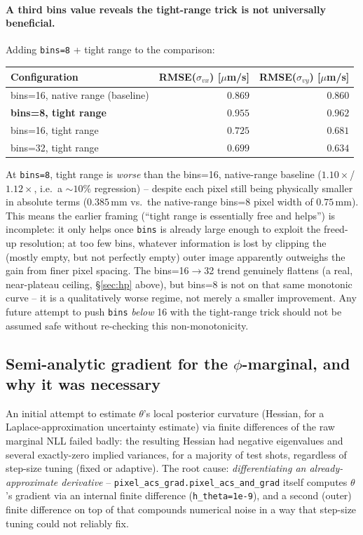 \documentclass[11pt,a4paper]{article}
\newcommand{\code}[1]{\texttt{#1}}
\begin{document}
\paragraph{A third bins value reveals the tight-range trick is not
universally beneficial.} Adding \code{bins=8} + tight range to the
comparison:

\begin{center}
\begin{tabular}{lrr}
\toprule
Configuration & RMSE($\sigma_{vx}$) [$\mu$m/s] & RMSE($\sigma_{vy}$) [$\mu$m/s] \\
\midrule
bins=16, native range (baseline)  & $0.869$ & $0.860$ \\
\textbf{bins=8, tight range}      & $\mathbf{0.955}$ & $\mathbf{0.962}$ \\
bins=16, tight range              & $0.725$ & $0.681$ \\
bins=32, tight range              & $0.699$ & $0.634$ \\
\bottomrule
\end{tabular}
\end{center}

At \code{bins=8}, tight range is \emph{worse} than the bins=16, native-range
baseline ($1.10\times$/$1.12\times$, i.e.\ a $\sim\!10\%$ regression) --
despite each pixel still being physically smaller in absolute terms
($0.385\,$mm vs.\ the native-range bins=8 pixel width of $0.75\,$mm). This
means the earlier framing (``tight range is essentially free and helps'')
is incomplete: it only helps once \code{bins} is already large enough to
exploit the freed-up resolution; at too few bins, whatever information is
lost by clipping the (mostly empty, but not perfectly empty) outer image
apparently outweighs the gain from finer pixel spacing. The bins=16$\to$32
trend genuinely flattens (a real, near-plateau ceiling, \S\ref{sec:hp}
above), but bins=8 is not on that same monotonic curve -- it is a
qualitatively worse regime, not merely a smaller improvement. Any future
attempt to push \code{bins} \emph{below} 16 with the tight-range trick
should not be assumed safe without re-checking this non-monotonicity.

\subsection{Semi-analytic gradient for the $\phi$-marginal, and why it was
necessary}
\label{sec:analytic-grad}

An initial attempt to estimate $\theta$'s local posterior curvature
(Hessian, for a Laplace-approximation uncertainty estimate) via finite
differences of the raw marginal NLL failed badly: the resulting Hessian had
negative eigenvalues and several exactly-zero implied variances, for a
majority of test shots, regardless of step-size tuning (fixed or adaptive).
The root cause: \emph{differentiating an already-approximate derivative}
-- \code{pixel\_acs\_grad.pixel\_acs\_and\_grad} itself computes $\theta$'s
gradient via an internal finite difference (\code{h\_theta=1e-9}), and a
second (outer) finite difference on top of that compounds numerical noise
in a way that step-size tuning could not reliably fix.
\end{document}
